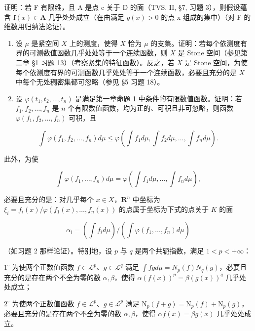 证明：若 F 有限维，且 A 是点 c 关于 D 的面（TVS, II, §7, 习题 3），则假设蕴含 \(\mathbf{f}(x) \in \mathbf{A}\) 几乎处处成立（在由满足 \(g(x) > 0\) 的点 x 组成的集中）（对 F 的维数用归纳法论证）。

\begin{enumerate}
\def\labelenumi{\arabic{enumi})}
\setcounter{enumi}{2}
\item
  设 \(\mu\) 是紧空间 \(X\) 上的测度，使得 \(X\) 恰为 \(\mu\) 的支集。证明：若每个依测度有界的可测数值函数几乎处处等于一个连续函数，则 \(X\) 是 Stone 空间（参见第二章 §1 习题 13）（考察紧集的特征函数）。反之，若 \(X\) 是 Stone 空间，为使每个依测度有界的可测函数几乎处处等于一个连续函数，必要且充分的是 \(X\) 中每个无处稠密集都可忽略（参见 §5 习题 18）。
\item
  设 \(\varphi(t_1, t_2, \ldots, t_n)\) 是满足第一章命题 1 中条件的有限数值函数。证明：若 \(f_1, f_2, \ldots, f_n\) 是 \(n\) 个有限数值函数，均为正的、可积且非可忽略，则函数 \(\varphi(f_1, f_2, \ldots, f_n)\) 可积，且
\end{enumerate}

\[
\int \varphi (f _ {1}, f _ {2}, \dots , f _ {n}) d \mu \leqslant \varphi (\int f _ {1} d \mu , \int f _ {2} d \mu , \dots , \int f _ {n} d \mu).
\]

此外，为使

\[
\int \varphi (f _ {1}, \dots , f _ {n}) d \mu = \varphi (\int f _ {1} d \mu , \dots , \int f _ {n} d \mu),
\]

必要且充分的是：对几乎每个 \(x \in X\)，\(\mathbf{R}^n\) 中坐标为 \(\xi_i = f_i(x) / \varphi(f_1(x), \ldots, f_n(x))\) 的点属于坐标为下式的点关于 \(K\) 的面

\[
\alpha_ {i} = (\int f _ {i} d \mu) / (\int \varphi (f _ {1}, \dots , f _ {n}) d \mu)
\]

（如习题 2 那样论证）。特别地，设 \(p\) 与 \(q\) 是两个共轭指数，满足 \(1 < p < +\infty\)：

\(1^{\circ}\) 为使两个正数值函数 \(f \in \mathcal{L}^{p}\)、\(g \in \mathcal{L}^{q}\) 满足 \(\int fg d\mu = N_{p}(f)N_{q}(g)\)，必要且充分的是存在两个不全为零的数 \(\alpha, \beta\)，使得 \(\alpha(f(x))^{p} = \beta(g(x))^{q}\) 几乎处处成立；

\(2^{\circ}\) 为使两个正数值函数 \(f \in \mathcal{L}^{p}\)、\(g \in \mathcal{L}^{p}\) 满足 \(\mathrm{N}_{p}(f + g) = \mathrm{N}_{p}(f) + \mathrm{N}_{p}(g)\)，必要且充分的是存在两个不全为零的数 \(\alpha, \beta\)，使得 \(\alpha f(x) = \beta g(x)\) 几乎处处成立。

